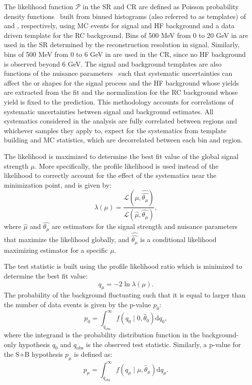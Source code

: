 The likelihood function $\mathcal{P}$ in the SR and CR are defined as Poisson probability density functions~\cite{Cranmer:1456844} built from binned histograms (also referred to as templates) of \mhnl and \mdv, respectively, using MC events for signal and HF background and a data driven template for the RC background. Bins of 500 MeV from 0 to 20 GeV in \mhnl are used in the SR determined by the \mhnl reconstruction resolution in signal. Similarly, bins of 500 MeV from 0 to 6 GeV in \mdv are used in the CR, since no HF background is observed beyond 6 GeV. The signal and background templates are also functions of the nuisance parameters~\cite{Cranmer:1456844} such that systematic uncertainties can affect the \mhnl or \mdv shapes for the signal process and the HF background whose yields are extracted from the fit and the normalization for the RC background whose yield is fixed to the prediction. This methodology accounts for correlations of systematic uncertainties between signal and background estimates. All systematics considered in the analysis are fully correlated between regions and whichever samples they apply to, expect for the systematics from template building and MC statistics, which are decorrelated between each bin and region. 

The likelihood is maximized to determine the best fit value of the global signal strength $\mu$. More specifically, the profile likelihood is used instead of the likelihood to correctly account for the effect of the systematics near the minimization point, and is given by:
\begin{equation}
    \lambda(\mu) = \frac{\mathcal{L}(\mu,\hat{\hat{\theta_\mu}})}{\mathcal{L}(\hat{\mu},\hat{\theta_\mu})},
\end{equation}
where $\hat{\mu}$ and $\hat{\theta_\mu}$ are estimators for the signal strength and nuisance parameters that maximize the likelihood globally, and $\hat{\hat{\theta_\mu}}$ is a conditional likelihood maximizing estimator for a specific $\mu$. 

The test statistic is built using the profile likelihood ratio which is minimized to determine the best fit value:
\begin{equation}
    q_{\mu} = -2\ln{\lambda(\mu)}.
\end{equation}
The probability of the background fluctuating such that it is equal to larger than the number of data events is given by the p-value $p_0$:
\begin{equation}
    p_0=\int_{q_{\mathrm{obs}}}^{\infty} f\left(q_0 \mid 0, \hat{\theta}_0\right) \mathrm{d} q_0,
\end{equation}
where the integrand is the probability distribution function in the background-only hypothesis $q_0$ and $q_{\mathrm{obs}}$ is the observed test statistic. Similarly, a p-value for the S+B hypothesis $p_{\mu}$ is defined as:
\begin{equation}
    p_\mu=\int_{q_{\mathrm{obs}}}^{\infty} f\left(q_\mu \mid \mu, \hat{\theta}_\mu\right) \mathrm{d} q_\mu.
\end{equation}

